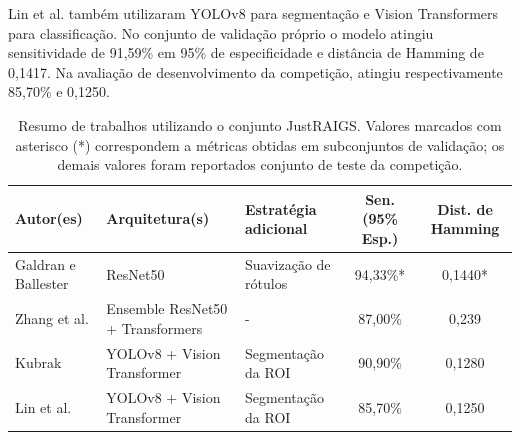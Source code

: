 \documentclass[12pt]{article}
\begin{document}
Lin et al. \cite{justraigs_hu_lin} também utilizaram YOLOv8 para segmentação e Vision Transformers para classificação. No conjunto de validação próprio o modelo atingiu sensitividade de 91,59\% em 95\% de especificidade e distância de Hamming de 0,1417. Na avaliação de desenvolvimento da competição, atingiu respectivamente 85,70\% e 0,1250.



\begin{table}[htb]
    \centering
    \scriptsize
    \begin{tabular}{|p{2.5cm}|p{3cm}|l|c|c|}
    \hline
    \textbf{Autor(es)} & \textbf{Arquitetura(s)} & \textbf{Estratégia adicional} & \textbf{Sen. (95\% Esp.)} & \textbf{Dist. de Hamming} \\
    \hline
    Galdran e Ballester \cite{justraigs_galdran} & ResNet50 & Suavização de rótulos & 94,33\%* & 0,1440* \\
    \hline
    Zhang et al. \cite{justraigs_zhang} & Ensemble ResNet50 + Transformers & - & 87,00\% & 0,239 \\
    \hline
    Kubrak \cite{justraigs_kubrak} & YOLOv8 + Vision Transformer & Segmentação da ROI & 90,90\% & 0,1280 \\
    \hline
    Lin et al. \cite{justraigs_hu_lin} & YOLOv8 + Vision Transformer & Segmentação da ROI & 85,70\% & 0,1250 \\
    \hline
    \end{tabular}
    \caption{Resumo de trabalhos utilizando o conjunto JustRAIGS. Valores marcados com asterisco (*) correspondem a métricas obtidas em subconjuntos de validação; os demais valores foram reportados conjunto de teste da competição.}
    \label{tab:justraigs_work}
\end{table}








\end{document}
